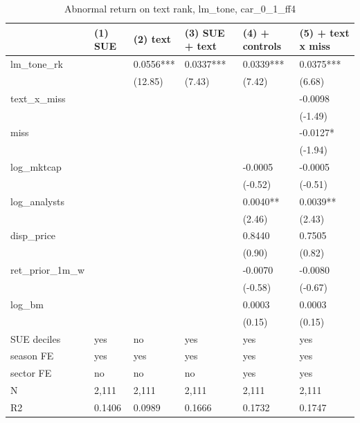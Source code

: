 \begin{table}
\caption{Abnormal return on text rank, lm_tone, car_0_1_ff4}
\label{tab:t8_regressions__lm_tone__car_0_1_ff4__validation}
\begin{tabular}{llllll}
\toprule
 & (1) SUE & (2) text & (3) SUE + text & (4) + controls & (5) + text x miss \\
\midrule
lm\_tone\_rk &  & 0.0556*** & 0.0337*** & 0.0339*** & 0.0375*** \\
 &  & (12.85) & (7.43) & (7.42) & (6.68) \\
text\_x\_miss &  &  &  &  & -0.0098 \\
 &  &  &  &  & (-1.49) \\
miss &  &  &  &  & -0.0127* \\
 &  &  &  &  & (-1.94) \\
log\_mktcap &  &  &  & -0.0005 & -0.0005 \\
 &  &  &  & (-0.52) & (-0.51) \\
log\_analysts &  &  &  & 0.0040** & 0.0039** \\
 &  &  &  & (2.46) & (2.43) \\
disp\_price &  &  &  & 0.8440 & 0.7505 \\
 &  &  &  & (0.90) & (0.82) \\
ret\_prior\_1m\_w &  &  &  & -0.0070 & -0.0080 \\
 &  &  &  & (-0.58) & (-0.67) \\
log\_bm &  &  &  & 0.0003 & 0.0003 \\
 &  &  &  & (0.15) & (0.15) \\
SUE deciles & yes & no & yes & yes & yes \\
season FE & yes & yes & yes & yes & yes \\
sector FE & no & no & no & yes & yes \\
N & 2,111 & 2,111 & 2,111 & 2,111 & 2,111 \\
R2 & 0.1406 & 0.0989 & 0.1666 & 0.1732 & 0.1747 \\
\bottomrule
\end{tabular}
\end{table}

